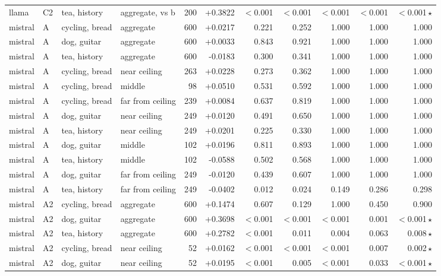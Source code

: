\begin{center}
\begin{longtable}{llllrrrrrrr}
llama & C2 & tea, history & aggregate, vs b & 200 & +0.3822 & $<$0.001 & $<$0.001 & $<$0.001 & $<$0.001 & $<$0.001\,$\star$ \\
mistral & A & cycling, bread & aggregate & 600 & +0.0217 & 0.221 & 0.252 & 1.000 & 1.000 & 1.000 \\
mistral & A & dog, guitar & aggregate & 600 & +0.0033 & 0.843 & 0.921 & 1.000 & 1.000 & 1.000 \\
mistral & A & tea, history & aggregate & 600 & -0.0183 & 0.300 & 0.341 & 1.000 & 1.000 & 1.000 \\
mistral & A & cycling, bread & near ceiling & 263 & +0.0228 & 0.273 & 0.362 & 1.000 & 1.000 & 1.000 \\
mistral & A & cycling, bread & middle & 98 & +0.0510 & 0.531 & 0.592 & 1.000 & 1.000 & 1.000 \\
mistral & A & cycling, bread & far from ceiling & 239 & +0.0084 & 0.637 & 0.819 & 1.000 & 1.000 & 1.000 \\
mistral & A & dog, guitar & near ceiling & 249 & +0.0120 & 0.491 & 0.650 & 1.000 & 1.000 & 1.000 \\
mistral & A & tea, history & near ceiling & 249 & +0.0201 & 0.225 & 0.330 & 1.000 & 1.000 & 1.000 \\
mistral & A & dog, guitar & middle & 102 & +0.0196 & 0.811 & 0.893 & 1.000 & 1.000 & 1.000 \\
mistral & A & tea, history & middle & 102 & -0.0588 & 0.502 & 0.568 & 1.000 & 1.000 & 1.000 \\
mistral & A & dog, guitar & far from ceiling & 249 & -0.0120 & 0.439 & 0.607 & 1.000 & 1.000 & 1.000 \\
mistral & A & tea, history & far from ceiling & 249 & -0.0402 & 0.012 & 0.024 & 0.149 & 0.286 & 0.298 \\
mistral & A2 & cycling, bread & aggregate & 600 & +0.1474 & 0.607 & 0.129 & 1.000 & 0.450 & 0.900 \\
mistral & A2 & dog, guitar & aggregate & 600 & +0.3698 & $<$0.001 & $<$0.001 & $<$0.001 & 0.001 & $<$0.001\,$\star$ \\
mistral & A2 & tea, history & aggregate & 600 & +0.2782 & $<$0.001 & 0.011 & 0.004 & 0.063 & 0.008\,$\star$ \\
mistral & A2 & cycling, bread & near ceiling & 52 & +0.0162 & $<$0.001 & $<$0.001 & $<$0.001 & 0.007 & 0.002\,$\star$ \\
mistral & A2 & dog, guitar & near ceiling & 52 & +0.0195 & $<$0.001 & 0.005 & $<$0.001 & 0.033 & $<$0.001\,$\star$ \\

\end{longtable}
\end{center}

